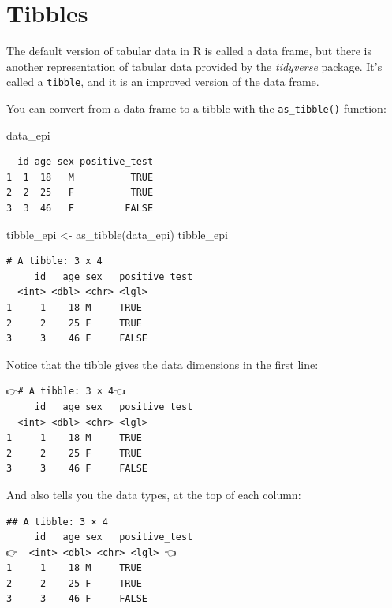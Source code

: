 \documentclass[
  letterpaper,
  DIV=11,
  numbers=noendperiod]{scrreprt}
\newenvironment{Shaded}{\begin{snugshade}}{\end{snugshade}}
\newcommand{\FunctionTok}[1]{\textcolor[rgb]{0.28,0.35,0.67}{#1}}
\newcommand{\NormalTok}[1]{\textcolor[rgb]{0.00,0.23,0.31}{#1}}
\newcommand{\OtherTok}[1]{\textcolor[rgb]{0.00,0.23,0.31}{#1}}
\begin{document}
\section{Tibbles}\label{tibbles}

The default version of tabular data in R is called a data frame, but
there is another representation of tabular data provided by the
\emph{tidyverse} package. It's called a \texttt{tibble}, and it is an
improved version of the data frame.

You can convert from a data frame to a tibble with the
\texttt{as\_tibble()} function:

\begin{Shaded}
\begin{Highlighting}[]
\NormalTok{data\_epi}
\end{Highlighting}
\end{Shaded}

\begin{verbatim}
  id age sex positive_test
1  1  18   M          TRUE
2  2  25   F          TRUE
3  3  46   F         FALSE
\end{verbatim}

\begin{Shaded}
\begin{Highlighting}[]
\NormalTok{tibble\_epi }\OtherTok{\textless{}{-}} \FunctionTok{as\_tibble}\NormalTok{(data\_epi)}
\NormalTok{tibble\_epi}
\end{Highlighting}
\end{Shaded}

\begin{verbatim}
# A tibble: 3 x 4
     id   age sex   positive_test
  <int> <dbl> <chr> <lgl>        
1     1    18 M     TRUE         
2     2    25 F     TRUE         
3     3    46 F     FALSE        
\end{verbatim}

Notice that the tibble gives the data dimensions in the first line:

\begin{verbatim}
👉# A tibble: 3 × 4👈
     id   age sex   positive_test
  <int> <dbl> <chr> <lgl>        
1     1    18 M     TRUE         
2     2    25 F     TRUE         
3     3    46 F     FALSE  
\end{verbatim}

And also tells you the data types, at the top of each column:

\begin{verbatim}
## A tibble: 3 × 4
     id   age sex   positive_test
👉  <int> <dbl> <chr> <lgl> 👈       
1     1    18 M     TRUE         
2     2    25 F     TRUE         
3     3    46 F     FALSE  
\end{verbatim}
\end{document}

